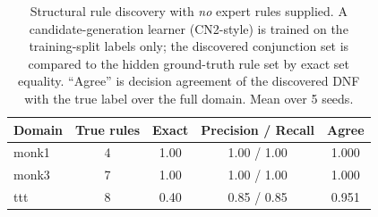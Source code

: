 \begin{table}[t]\centering\small
\caption{Structural rule discovery with \emph{no} expert rules supplied. A candidate-generation learner (CN2-style) is trained on the training-split labels only; the discovered conjunction set is compared to the hidden ground-truth rule set by exact set equality. ``Agree'' is decision agreement of the discovered DNF with the true label over the full domain. Mean over 5 seeds.}
\label{tab:discovery}
\begin{tabular}{lcccc}
\toprule
Domain & True rules & Exact & Precision / Recall & Agree \\
\midrule
monk1 & 4 & 1.00 & 1.00 / 1.00 & 1.000 \\
monk3 & 7 & 1.00 & 1.00 / 1.00 & 1.000 \\
ttt & 8 & 0.40 & 0.85 / 0.85 & 0.951 \\
\end{tabular}
\end{table}